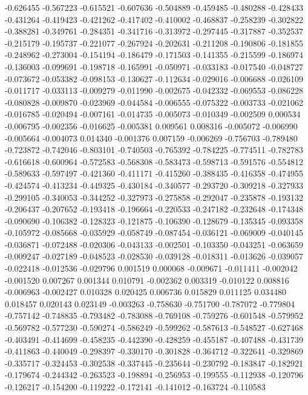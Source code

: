 -0.626455
-0.567223
-0.615521
-0.607636
-0.504889
-0.459485
-0.480288
-0.428433
-0.431264
-0.419423
-0.421262
-0.417402
-0.410002
-0.468837
-0.258239
-0.302822
-0.388281
-0.349761
-0.284351
-0.341716
-0.313972
-0.297445
-0.317887
-0.352537
-0.215179
-0.195737
-0.221077
-0.267924
-0.202631
-0.211208
-0.190806
-0.181855
-0.248962
-0.273004
-0.154194
-0.186479
-0.171503
-0.141355
-0.215599
-0.186974
-0.136003
-0.099691
-0.198718
-0.165991
-0.050971
-0.033183
-0.017540
-0.048727
-0.073672
-0.053382
-0.098153
-0.130627
-0.112634
-0.029016
-0.006688
-0.026109
-0.011717
-0.033113
-0.009279
-0.011990
-0.002675
-0.042332
-0.069553
-0.086228
-0.080828
-0.009870
-0.023969
-0.044584
-0.006555
-0.075322
-0.003733
-0.021062
-0.016785
-0.020494
-0.007161
-0.014735
-0.005073
-0.010349
-0.002509
0.000534
-0.006795
-0.002356
-0.016625
-0.005381
0.009561
0.008316
-0.005072
-0.006990
-0.005664
-0.004073
0.014340
-0.001376
0.007159
-0.006269
-0.756703
-0.789480
-0.723872
-0.742046
-0.803101
-0.740503
-0.765392
-0.784225
-0.774511
-0.782783
-0.616618
-0.600964
-0.572583
-0.568308
-0.583473
-0.598713
-0.591576
-0.554812
-0.589633
-0.597497
-0.421360
-0.411171
-0.415260
-0.388435
-0.416358
-0.474955
-0.424574
-0.413234
-0.449325
-0.430184
-0.340577
-0.293720
-0.309218
-0.327933
-0.299105
-0.340053
-0.344252
-0.327973
-0.275858
-0.292047
-0.235878
-0.193132
-0.206437
-0.207652
-0.193418
-0.196664
-0.220533
-0.247182
-0.232648
-0.174348
-0.090690
-0.106382
-0.128323
-0.121875
-0.106390
-0.128679
-0.135345
-0.093358
-0.105972
-0.085668
-0.035929
-0.058749
-0.087454
-0.036121
-0.069009
-0.040145
-0.036871
-0.072488
-0.020306
-0.043133
-0.002501
-0.103350
-0.043251
-0.063659
-0.009247
-0.027189
-0.048523
-0.028530
-0.039128
-0.018311
-0.013626
-0.039057
-0.022418
-0.012536
-0.029796
0.001519
0.000068
-0.009671
-0.011411
-0.002042
-0.001520
0.007267
0.001344
0.010791
-0.002362
0.003319
-0.010122
0.008816
-0.006963
-0.002427
0.010328
0.020425
0.006736
0.015829
0.011125
0.034480
0.018457
0.020143
0.023149
-0.003263
-0.758630
-0.751700
-0.787072
-0.779804
-0.757142
-0.748835
-0.793482
-0.783088
-0.769108
-0.759276
-0.601548
-0.579952
-0.569782
-0.577230
-0.590274
-0.586249
-0.599262
-0.587613
-0.548527
-0.627468
-0.403491
-0.414699
-0.458235
-0.442390
-0.428259
-0.455187
-0.407488
-0.431739
-0.411863
-0.440049
-0.298397
-0.330170
-0.301828
-0.364712
-0.322641
-0.329869
-0.335717
-0.324453
-0.302538
-0.337445
-0.235644
-0.230792
-0.183847
-0.182921
-0.179674
-0.244342
-0.263523
-0.198894
-0.256953
-0.199555
-0.112938
-0.120796
-0.126217
-0.154200
-0.119222
-0.172141
-0.141012
-0.163724
-0.110583
